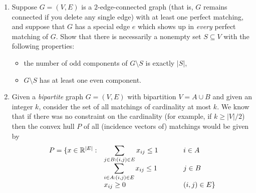 \documentclass[12pt]{article}
\begin{document}
\begin{enumerate}
\newpage
\item
Suppose $G = (V,E)$ is a $2$-edge-connected graph (that is, $G$ remains connected if you delete any single edge) with at least one perfect matching, and suppose that $G$ has a special edge $e$ which shows up in \emph{every} perfect matching of $G$. Show that there is necessarily a nonempty set $S \subseteq V$ with the following properties:
\begin{itemize}
\item the number of odd components of $G\setminus S$ is exactly $|S|$,

\item $G\setminus S$ has at least one even component.
\end{itemize}



\newpage
\item
Given a {\it bipartite} graph $G=(V,E)$ with bipartition $V=A \cup B$
and given an integer $k$, consider the set of all matchings of
cardinality at most $k$. We know that if there was no constraint on
the cardinality (for example, if $k\geq |V|/2$) then the convex hull $P$
of all (incidence vectors of) matchings would be given by
$$ \begin{array}{ll@{\hspace{0.5in}}l}
P=\{ x\in \R^{|E|}: & \displaystyle \sum_{j\in B: (i,j)\in E} x_{ij}
\leq 1 & i \in A \\
& \displaystyle \sum_{i\in A: (i,j)\in E} x_{ij}
\leq 1 & j \in B \\
 & x_{ij}\geq 0 & (i,j)\in E \} \end{array}$$


\end{enumerate}
\end{document}

